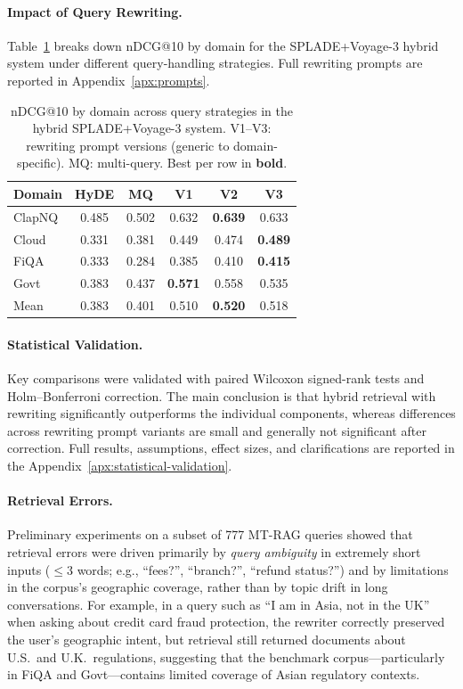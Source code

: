 \documentclass[11pt]{article}
\begin{document}
\paragraph{Impact of Query Rewriting.}
Table~\ref{tab:ndcg_rewriting} breaks down nDCG@10 by domain for the SPLADE+Voyage-3 hybrid system under different query-handling strategies. Full rewriting prompts are reported in Appendix~\ref{apx:prompts}.

\begin{table}[t]
\small
\centering
\begin{tabular}{@{}lccccc@{}}
\toprule
\textbf{Domain} & \textbf{HyDE} & \textbf{MQ} & \textbf{V1} & \textbf{V2} & \textbf{V3} \\
\midrule
ClapNQ & 0.485 & 0.502 & 0.632 & \textbf{0.639} & 0.633 \\
Cloud  & 0.331 & 0.381 & 0.449 & 0.474 & \textbf{0.489} \\
FiQA   & 0.333 & 0.284 & 0.385 & 0.410 & \textbf{0.415} \\
Govt   & 0.383 & 0.437 & \textbf{0.571} & 0.558 & 0.535 \\
\midrule
Mean & 0.383 & 0.401 & 0.510 & \textbf{0.520} & 0.518 \\
\bottomrule
\end{tabular}
\caption{nDCG@10 by domain across query strategies in the hybrid SPLADE+Voyage-3 system. V1--V3: rewriting prompt versions (generic to domain-specific). MQ: multi-query. Best per row in \textbf{bold}.}
\label{tab:ndcg_rewriting}
\end{table}

\paragraph{Statistical Validation.}
Key comparisons were validated with paired Wilcoxon signed-rank tests and Holm--Bonferroni correction. The main conclusion is that hybrid retrieval with rewriting significantly outperforms the individual components, whereas differences across rewriting prompt variants are small and generally not significant after correction. Full results, assumptions, effect sizes, and clarifications are reported in the Appendix~\ref{apx:statistical-validation}.


\paragraph{Retrieval Errors.} Preliminary experiments on a subset of 777 MT-RAG queries showed that retrieval errors were driven primarily by \emph{query ambiguity} in extremely short inputs ($\leq 3$ words; e.g., ``fees?'', ``branch?'', ``refund status?'') and by limitations in the corpus's geographic coverage, rather than by topic drift in long conversations. For example, in a query such as ``I am in Asia, not in the UK'' when asking about credit card fraud protection, the rewriter correctly preserved the user's geographic intent, but retrieval still returned documents about U.S.\ and U.K.\ regulations, suggesting that the benchmark corpus---particularly in FiQA and Govt---contains limited coverage of Asian regulatory contexts.
\end{document}
